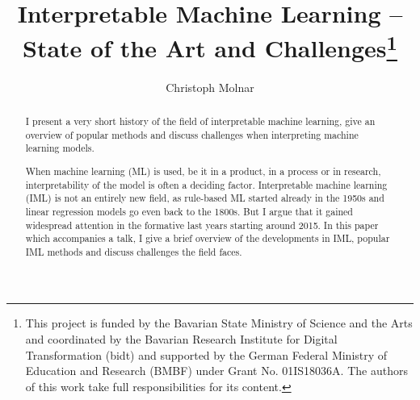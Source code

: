 \documentclass[runningheads]{llncs}
\begin{document}
%
\title{Interpretable Machine Learning -- State of the Art and Challenges\thanks{This project is funded by the Bavarian State Ministry of Science and the Arts and coordinated by the Bavarian Research Institute for Digital Transformation (bidt) and supported by the German Federal Ministry of Education and Research (BMBF) under Grant No. 01IS18036A.
The authors of this work take full responsibilities for its content.
}}
%
%
\author{Christoph Molnar}
%
%
%
\maketitle              %
%
\begin{abstract}
I present a very short history of the field of interpretable machine learning, give an overview of popular methods and discuss challenges when interpreting machine learning models.

When machine learning (ML) is used, be it in a product, in a process or in research, interpretability of the model is often a deciding factor.
Interpretable machine learning (IML) is not an entirely new field, as rule-based ML started already in the 1950s and linear regression models go even back to the 1800s.
But I argue that it gained widespread attention in the formative last years starting around 2015.
In this paper which accompanies a talk, I give a brief overview of the developments in IML, popular IML methods and discuss challenges the field faces.



\end{abstract}
%
%
%
\end{document}
